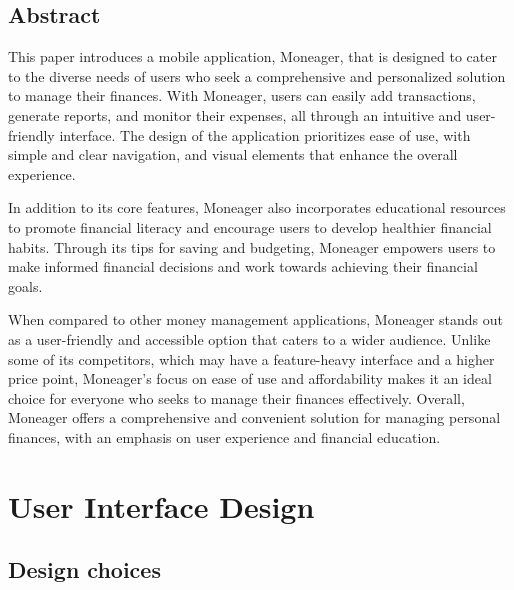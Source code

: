 \documentclass[12pt,a4paper]{book}
\theoremstyle{definition}
\theoremstyle{remark}
\begin{document}
\vfill
 


\newpage
\normalsize{}

\section*{Abstract} 
 
\hspace{\parindent}\hspace{\parindent} This paper introduces a mobile application, Moneager, that is designed to cater to the diverse needs of users who seek a comprehensive and personalized solution to manage their finances. With Moneager, users can easily add transactions, generate reports, and monitor their expenses, all through an intuitive and user-friendly interface. The design of the application prioritizes ease of use, with simple and clear navigation, and visual elements that enhance the overall experience.

\hspace{\parindent}In addition to its core features, Moneager also incorporates educational resources to promote financial literacy and encourage users to develop healthier financial habits. Through its tips for saving and budgeting, Moneager empowers users to make informed financial decisions and work towards achieving their financial goals.

\hspace{\parindent}When compared to other money management applications, Moneager stands out as a user-friendly and accessible option that caters to a wider audience. Unlike some of its competitors, which may have a feature-heavy interface and a higher price point, Moneager's focus on ease of use and affordability makes it an ideal choice for everyone who seeks to manage their finances effectively. Overall, Moneager offers a comprehensive and convenient solution for managing personal finances, with an emphasis on user experience and financial education.


\newpage
\normalsize{}


\tableofcontents


\chapter{User Interface Design}
    \section{Design choices}
\end{document}
